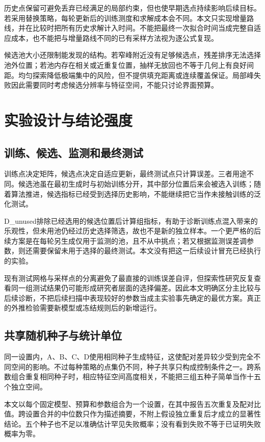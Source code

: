 历史点保留可避免丢弃已经满足的局部约束，但也使早期选点持续影响后续目标。若采用替换策略，每轮更新后的训练测度和求解成本会不同。本文只实现增量路线，并在比较时把所有历史求解计入时间。不能把最终一次拟合时间当成完整自适应成本，也不能把与增量路线不同的已有采样方法视为逐公式复现。

候选池大小还限制能发现的结构。若窄峰附近没有足够候选点，残差排序无法选择池外位置；若池内存在相关或近重复位置，抽样无放回也不等于几何上有良好间距。均匀探索降低极端集中的风险，但不提供填充距离或连续覆盖保证。局部峰失败因此需要同时考虑候选分辨率与特征空间，不能只讨论界面预算。

\section{实验设计与结论强度}
\subsection{训练、候选、监测和最终测试}
训练点决定矩阵，候选点决定自适应更新，最终测试点只计算误差。三者用途不同。候选池虽在最初生成时与初始训练分开，其中部分位置后来会被选入训练；随着算法推进，候选指标已经受到选择历史影响，不能继续把它当作未接触训练的泛化测试。

D\_unused排除已经选用的候选位置后计算组指标，有助于诊断训练点混入带来的乐观性，但未用池仍经过历史选择筛选，故也不是新的独立样本。一个更严格的后续方案是在每轮另生成仅用于监测的池，且不从中挑点；若又根据监测误差调参数，则还需要保留未用于选择的最终测试。本文没有把这一后续设计冒充已经执行的实验。

现有测试网格与采样点的分离避免了最直接的训练误差自评，但探索性研究反复查看同一组测试结果仍可能形成研究者层面的选择偏差。因此本文明确区分主比较与后续诊断，不把后续扫描中表现较好的参数当成主实验事先确定的最优方案。真正的外推检验需要新模型或冻结规则后的新增运行。

\subsection{共享随机种子与统计单位}
同一设置内，A、B、C、D使用相同种子生成特征，这使配对差异较少受到完全不同空间的影响。不过每种策略的点集仍不同，种子共享只构成控制条件之一。跨系数组合重复相同种子时，相应特征空间高度相关，不能把三组五种子简单当作十五个独立空间。

本文以每个固定模型、预算和参数组合为一个设置，在其中报告五次重复及配对比值。跨设置合并的中位数只作为描述摘要，不附上假设独立重复后才成立的显著性结论。五个种子也不足以准确估计罕见失败概率；没有看到失败不等于已证明失败概率为零。

